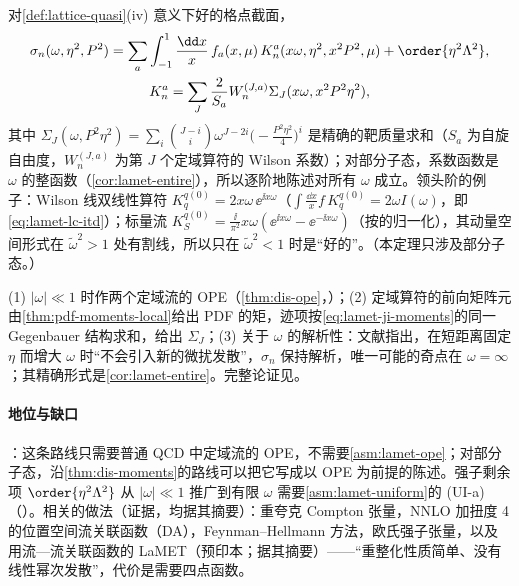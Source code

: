 \begin{theorem}\label{thm:lamet-lcs}
对\cref{def:lattice-quasi}(iv) 意义下好的格点截面，
\begin{equation}\label{eq:lamet-lcs}
\begin{gathered}
\sigma_n(\omega,\eta^2,P^2)=\sum_a\int_{-1}^1\frac{\dd x}x\,f_a(x,\mu)\,K^a_n(x\omega,\eta^2,x^2P^2,\mu)+\order{\eta^2\Lambda^2},\\
K^a_n=\sum_J\frac2{S_a}W^{(J,a)}_n\Sigma_J(x\omega,x^2P^2\eta^2),
\end{gathered}
\end{equation}
其中 $\Sigma_J(\omega,P^2\eta^2)=\sum_i\binom{J-i}i\omega^{J-2i}\big(-\frac{P^2\eta^2}4\big)^i$ 是精确的靶质量求和（$S_a$ 为自旋自由度，$W^{(J,a)}_n$ 为第 $J$ 个定域算符的 Wilson 系数）；对部分子态，系数函数是 $\omega$ 的整函数（\cref{cor:lamet-entire}），所以逐阶地陈述对所有 $\omega$ 成立。领头阶的例子：Wilson 线双线性算符 $K^{q(0)}_q=2x\omega\,\ee^{\ii x\omega}$（$\int\frac{\dd x}x f\,K^{q(0)}_q=2\omega I(\omega)$，即\cref{eq:lamet-lc-itd}）；标量流 $K^{q(0)}_S=\frac{\ii}{\pi^2}x\omega(\ee^{\ii x\omega}-\ee^{-\ii x\omega})$（按\cite{MaQiu2018}的归一化），其动量空间形式在 $\tilde\omega^2>1$ 处有割线，所以只在 $\tilde\omega^2<1$ 时是“好的”。（本定理只涉及部分子态。）
\end{theorem}

\begin{proofsketch}
(1) $|\omega|\ll1$ 时作两个定域流的 OPE（\cref{thm:dis-ope}，\tagA）；(2) 定域算符的前向矩阵元由\cref{thm:pdf-moments-local}给出 PDF 的矩，迹项按\cref{eq:lamet-ji-moments}的同一 Gegenbauer 结构求和，给出 $\Sigma_J$；(3) 关于 $\omega$ 的解析性：文献\cite{MaQiu2018}指出，在短距离固定 $\eta$ 而增大 $\omega$ 时“不会引入新的微扰发散”，$\sigma_n$ 保持解析，唯一可能的奇点在 $\omega=\infty$；其精确形式是\cref{cor:lamet-entire}。完整论证见\cite{MaQiu2018}。
\end{proofsketch}

\paragraph{地位与缺口}
\tagA：这条路线只需要普通 QCD 中定域流的 OPE，不需要\cref{asm:lamet-ope}；对部分子态，沿\cref{thm:dis-moments}的路线可以把它写成以 OPE 为前提的陈述。强子剩余项 $\order{\eta^2\Lambda^2}$ 从 $|\omega|\ll1$ 推广到有限 $\omega$ 需要\cref{asm:lamet-uniform}的 (UI-a)（\tagC）。相关的做法（证据，均据其摘要）：重夸克 Compton 张量\cite{DetmoldLin2006}，NNLO 加扭度 4 的位置空间流关联函数（DA）\cite{Braun:2007wv}，Feynman--Hellmann 方法\cite{ChambersEtAl2017}，欧氏强子张量\cite{Liu:1993cv}，以及用流—流关联函数的 LaMET\cite{Zhang:2026lle}（预印本；据其摘要）——“重整化性质简单、没有线性幂次发散”，代价是需要四点函数。


